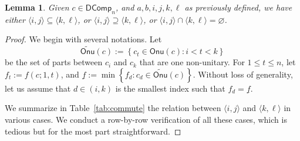 \documentclass[reqno]{amsart}
\numberwithin{equation}{section}
\newtheorem{lemma}[theorem]{Lemma}
\theoremstyle{definition}
\theoremstyle{named}
\newcommand{\set}[1]{\left\{#1\right\}}
\def\DComp{\mathsf{DComp}}
\def\Onu{\mathsf{Onu}}
\def\tonu{\widetilde{\Onu}}
\def\uf{\underline{f}}
\begin{document}
\begin{lemma}\label{lemma-interval}
Given $c\in \DComp_n$, and $a,b,i,j,k,\ell$ as previously defined, we have either $\langle i,j\rangle \subseteq \langle k,\ell\rangle$, or $\langle i,j\rangle \supseteq \langle k,\ell\rangle$, or $\langle i,j\rangle \cap \langle k,\ell\rangle=\varnothing$.
\end{lemma}
\begin{proof}
We begin with several notations. Let
$$\tonu(c):=\set{c_t\in\Onu(c):i<t<k}$$ be the set of parts between $c_i$ and $c_k$ that are one non-unitary. For $1\le t\le n$, let $f_t:=f(c;1,t)$, and $\uf:=\min\set{f_d: c_d\in \tonu(c)}$. Without loss of generality, let us assume that $d\in (i,k)$ is the smallest index such that $f_d=\uf$.

We summarize in Table~\ref{tab:commute} the relation between $\langle i,j\rangle$ and $\langle k,\ell\rangle$ in various cases. We conduct a row-by-row verification of all these cases, which is tedious but for the most part straightforward. 	


\end{proof}
\end{document}
